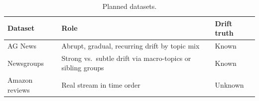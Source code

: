 \documentclass[conference]{IEEEtran}
\begin{document}
\begin{table}[!t]
\centering
\caption{Planned datasets.}
\label{tab:data}
\small
\begin{tabular}{>{\raggedright\arraybackslash}p{1.85cm}>{\raggedright\arraybackslash}p{3.6cm}>{\raggedright\arraybackslash}p{1.4cm}}
\toprule
Dataset & Role & Drift truth \\
\midrule
AG News & Abrupt, gradual, recurring drift by topic mix & Known \\
20 Newsgroups & Strong vs.\ subtle drift via macro-topics or sibling groups & Known \\
Amazon reviews & Real stream in time order & Unknown \\
\bottomrule
\end{tabular}
\end{table}
\end{document}
